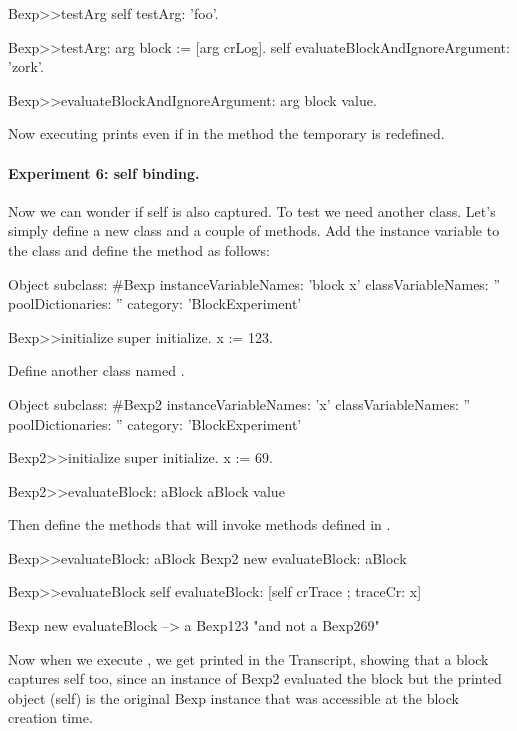 \documentclass[a4paper,10pt,twoside]{book}
\begin{document}
\begin{code}{}
Bexp>>testArg
	self testArg: 'foo'.

Bexp>>testArg: arg
	block := [arg crLog].
	self evaluateBlockAndIgnoreArgument: 'zork'.

Bexp>>evaluateBlockAndIgnoreArgument: arg
	block value.
\end{code}

Now executing  prints  even if in the method  the temporary  is redefined.

\paragraph{Experiment 6: self binding.} Now we can wonder if self is also captured.
To test we need another class. Let's simply define a new class and a couple of methods.
Add the instance variable  to the class  and define the  method as follows:

\begin{code}{}
Object subclass: #Bexp
	instanceVariableNames: 'block x'
	classVariableNames: ''
	poolDictionaries: ''
	category: 'BlockExperiment'

Bexp>>initialize
    super initialize.
	x := 123.
\end{code}

Define another class named .

\begin{code}{}
Object subclass: #Bexp2
	instanceVariableNames: 'x'
	classVariableNames: ''
	poolDictionaries: ''
	category: 'BlockExperiment'

Bexp2>>initialize
	super initialize.
	x := 69.

Bexp2>>evaluateBlock: aBlock
	aBlock value
\end{code}

Then define the methods that will invoke  methods defined in .
\begin{code}{}
Bexp>>evaluateBlock: aBlock
	Bexp2 new evaluateBlock: aBlock

Bexp>>evaluateBlock
	self evaluateBlock: [self crTrace ; traceCr: x]
\end{code}

\begin{code}{}
Bexp new evaluateBlock
  --> a Bexp123  "and not a Bexp269"
\end{code}

Now when we execute , we get  printed in the Transcript, showing that a block captures self too, since an instance of Bexp2 evaluated the block but the printed object (self) is the original Bexp instance that was accessible at the block creation time.
\end{document}

